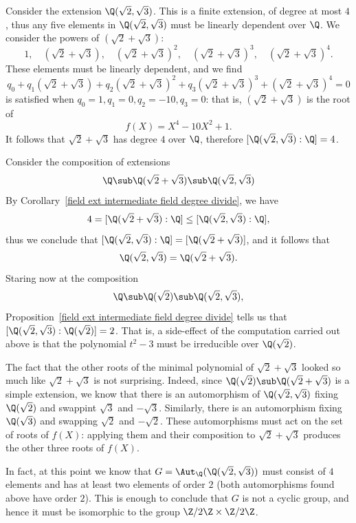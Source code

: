 \begin{example}
Consider the extension $\Q(\sqrt{2},\sqrt{3})$. This is a finite extension, of degree at most $4$, thus any five elements in $\Q(\sqrt{2},\sqrt{3})$ must be linearly dependent over $\Q$. We consider the powers of $(\sqrt{2}+\sqrt{3})$:
\[1,\quad(\sqrt{2}+\sqrt{3}),\quad(\sqrt{2}+\sqrt{3})^2,\quad(\sqrt{2}+\sqrt{3})^3,\quad(\sqrt{2}+\sqrt{3})^4.\]
These elements must be linearly dependent, and we find
\[q_0+q_1(\sqrt{2}+\sqrt{3})+q_2(\sqrt{2}+\sqrt{3})^2+q_3(\sqrt{2}+\sqrt{3})^3+(\sqrt{2}+\sqrt{3})^4=0\]
is satisfied when $q_0=1,q_1=0,q_2=-10,q_3=0$: that is, $(\sqrt{2}+\sqrt{3})$ is the root of
\[f(X)=X^4-10X^2+1.\]
It follows that $\sqrt{2}+\sqrt{3}$ has degree $4$ over $\Q$, therefore $[\Q(\sqrt{2},\sqrt{3}):\Q]=4$.\par
Consider the composition of extensions
\[\Q\sub\Q(\sqrt{2}+\sqrt{3})\sub\Q(\sqrt{2},\sqrt{3})\]
By Corollary~\ref{field ext intermediate field degree divide}, we have
\[4=[\Q(\sqrt{2}+\sqrt{3}):\Q]\leq[\Q(\sqrt{2},\sqrt{3}):\Q],\]
thus we conclude that $[\Q(\sqrt{2},\sqrt{3}):\Q]=[\Q(\sqrt{2}+\sqrt{3})]$, and it follows that
\[\Q(\sqrt{2},\sqrt{3})=\Q(\sqrt{2}+\sqrt{3}).\]
Staring now at the composition
\[\Q\sub\Q(\sqrt{2})\sub\Q(\sqrt{2},\sqrt{3}),\]
Proposition~\ref{field ext intermediate field degree divide} tells us that $[\Q(\sqrt{2},\sqrt{3}):\Q(\sqrt{2})]=2$. That is, a side-effect of the computation carried out above is that the polynomial $t^2-3$ must be irreducible over $\Q(\sqrt{2})$.\par
The fact that the other roots of the minimal polynomial of $\sqrt{2}+\sqrt{3}$ looked so much like $\sqrt{2}+\sqrt{3}$ is not surprising. Indeed, since $\Q(\sqrt{2})\sub\Q(\sqrt{2}+\sqrt{3})$ is a simple extension, we know that there is an automorphism of $\Q(\sqrt{2},\sqrt{3})$ fixing $\Q(\sqrt{2})$ and swappint $\sqrt{3}$ and $-\sqrt{3}$. Similarly, there is an automorphism fixing $\Q(\sqrt{3})$ and swapping $\sqrt{2}$ and $-\sqrt{2}$. These automorphisms must act on the set of roots of $f(X)$: applying them and their composition to $\sqrt{2}+\sqrt{3}$ produces the other three roots of $f(X)$.\par
In fact, at this point we know that $G=\Aut_{\Q}(\Q(\sqrt{2},\sqrt{3}))$ must consist of $4$ elements and has at least two elements of order $2$ (both automorphisms found above have order $2$). This is enough to conclude that $G$ is not a cyclic group, and hence it must be isomorphic to the group $\Z/2\Z\times\Z/2\Z$.
\end{example}
